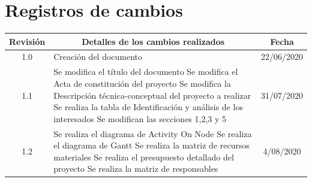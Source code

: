 \documentclass[11pt]{charter}
\begin{document}
\maketitle
\thispagestyle{empty}
\pagebreak


\thispagestyle{empty}
{\setlength{\parskip}{0pt}
\tableofcontents{}
}
\pagebreak


\section{Registros de cambios}
\label{sec:registro}


\begin{table}[ht]
\label{tab:registro}
\centering

\begin{tabularx}{\linewidth}{@{}|c|X|c|@{}}
\hline
\rowcolor[HTML]{C0C0C0} 
Revisión & \multicolumn{1}{c|}{\cellcolor[HTML]{C0C0C0}Detalles de los cambios realizados} & Fecha      \\ \hline
1.0      & Creación del documento                                                          & 22/06/2020 \\ \hline
1.1      & Se modifica el título del documento \newline                                                                                Se modifica el Acta de constitución del proyecto \newline                                                                               
Se modifica la Descripción técnica-conceptual del proyecto a realizar \newline                                                                               
Se realiza la tabla de Identificación y análisis de los interesados \newline                                                                               
Se modifican las secciones 1,2,3 y 5 & 31/07/2020 \\ \hline
1.2      & Se realiza el diagrama de Activity On Node \newline                                                                              
Se realiza el diagrama de Gantt\newline                                                                              
Se realiza la matriz de recursos materiales \newline                                                                              
Se realiza el presupuesto detallado del proyecto \newline                                                                              
Se realiza la matriz de responsables & 4/08/2020\\ \hline

\end{tabularx}
\end{table}
\end{document}
